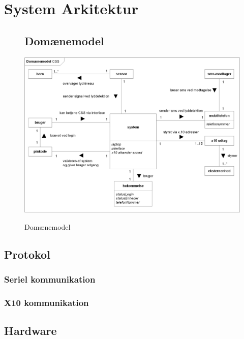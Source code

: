 %
%
\chapter{System Arkitektur}

\begin{figure}[htbp] \centering
\section{Domænemodel}
{\includegraphics[width=\textwidth]{billeder/diagrammer/Domain_Model}}
\caption{Domænemodel}
\label{lab:domainmodel}
\end{figure}

\section{Protokol}

\subsection{Seriel kommunikation}


\newpage
\subsection{X10 kommunikation}


\newpage
\section{Hardware}

